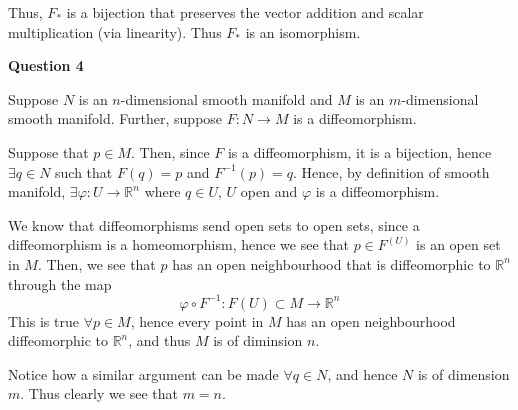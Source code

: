 \documentclass[10pt]{article}
\newcommand{\R}{\mathbb{R}}
\begin{document}
Thus, $F_{*}$ is a bijection that preserves the vector addition and scalar multiplication (via linearity). Thus $F_{*}$ is an isomorphism.

\newpage

\textbf{Question 4}

Suppose $N$ is an $n$-dimensional smooth manifold and $M$ is an $m$-dimensional smooth manifold. Further, suppose $F: N\to M$ is a diffeomorphism. 

Suppose that $p\in M$. Then, since $F$ is a diffeomorphism, it is a bijection, hence $\exists q\in N$ such that $F(q) = p$ and $F^{-1}(p) = q$. Hence, by definition of smooth manifold, $\exists \varphi: U \to \R^{n}$ where $q\in U$, $U$ open and $\varphi$ is a diffeomorphism.

We know that diffeomorphisms send open sets to open sets, since a diffeomorphism is a homeomorphism, hence we see that $p\in F^(U)$ is an open set in $M$. Then, we see that $p$ has an open neighbourhood that is diffeomorphic to $\R^{n}$ through the map
$$\varphi \circ F^{-1}: F(U)\subset M \to \R^{n}$$
This is true $\forall p\in M$, hence every point in $M$ has an open neighbourhood diffeomorphic to $\R^{n}$, and thus $M$ is of diminsion $n$.

Notice how a similar argument can be made $\forall q\in N$, and hence $N$ is of dimension $m$. Thus clearly we see that $m=n$.
\end{document}
